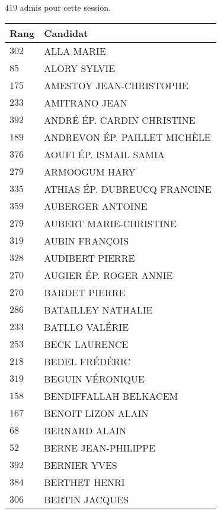 



  $419$ admis pour cette session.

  \begin{xltabular}{\linewidth}{|l|X|}
    \hline
    \textbf{Rang} & \textbf{Candidat} \\
    \hline
    $302$ & ALLA MARIE \\
    \hline
    $85$ & ALORY SYLVIE \\
    \hline
    $175$ & AMESTOY JEAN-CHRISTOPHE \\
    \hline
    $233$ & AMITRANO JEAN \\
    \hline
    $392$ & ANDRÉ ÉP. CARDIN CHRISTINE \\
    \hline
    $189$ & ANDREVON ÉP. PAILLET MICHÈLE \\
    \hline
    $376$ & AOUFI ÉP. ISMAIL SAMIA \\
    \hline
    $279$ & ARMOOGUM HARY \\
    \hline
    $335$ & ATHIAS ÉP. DUBREUCQ FRANCINE \\
    \hline
    $359$ & AUBERGER ANTOINE \\
    \hline
    $279$ & AUBERT MARIE-CHRISTINE \\
    \hline
    $319$ & AUBIN FRANÇOIS \\
    \hline
    $328$ & AUDIBERT PIERRE \\
    \hline
    $270$ & AUGIER ÉP. ROGER ANNIE \\
    \hline
    $270$ & BARDET PIERRE \\
    \hline
    $286$ & BATAILLEY NATHALIE \\
    \hline
    $233$ & BATLLO VALÉRIE \\
    \hline
    $253$ & BECK LAURENCE \\
    \hline
    $218$ & BEDEL FRÉDÉRIC \\
    \hline
    $319$ & BEGUIN VÉRONIQUE \\
    \hline
    $158$ & BENDIFFALLAH BELKACEM \\
    \hline
    $167$ & BENOIT LIZON ALAIN \\
    \hline
    $68$ & BERNARD ALAIN \\
    \hline
    $52$ & BERNE JEAN-PHILIPPE \\
    \hline
    $392$ & BERNIER YVES \\
    \hline
    $384$ & BERTHET HENRI \\
    \hline
    $306$ & BERTIN JACQUES \\

\end{xltabular}

